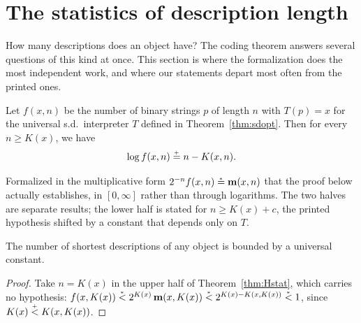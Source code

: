 \section{The statistics of description length }
How many descriptions does an object have? The coding theorem answers several questions
of this kind at once. This section is where the formalization does the most independent
work, and where our statements depart most often from the printed ones.


\begin{theorem}
  \leanok
   \label{thm:Hstat} 
  Let $f(x,n)$ be the number of binary strings $p$ of length $n$ with
$T(p)=x$ for the universal s.d.~interpreter $T$ defined in 
Theorem~\ref{thm:sdopt}.
  Then for every $n \ge K(x)$, we have
  \begin{equation}
	\log f(x,n) \stackrel{{}_+}{=} n - K(x,n). \label{eq:Hstat} 
  \end{equation}
 \end{theorem}

\begin{formalization}
Formalized in the multiplicative form $2^{-n} f(x,n) \stackrel{{}_*}{=} \mathbf{m}(x,n)$ that the proof below actually establishes, in $[0,\infty]$ rather than through logarithms. The two halves are separate results; the lower half is stated for $n \ge K(x) + c$, the printed hypothesis shifted by a constant that depends only on $T$.
\end{formalization}

  \begin{corollary}
  \label{cor:shortest-descriptions}
  \leanok
   The number of shortest descriptions of any object is
bounded by a universal constant.
 \end{corollary}
\begin{proof}
  \leanok
  Take $n = K(x)$ in the upper half of Theorem~\ref{thm:Hstat}, which carries no hypothesis: $f(x,K(x)) \stackrel{{}_*}{<} 2^{K(x)}\, \mathbf{m}(x,K(x)) \stackrel{{}_*}{<} 2^{K(x) - K(x,K(x))} \stackrel{{}_*}{<} 1$, since $K(x) \stackrel{{}_+}{<} K(x,K(x))$.
\end{proof}


